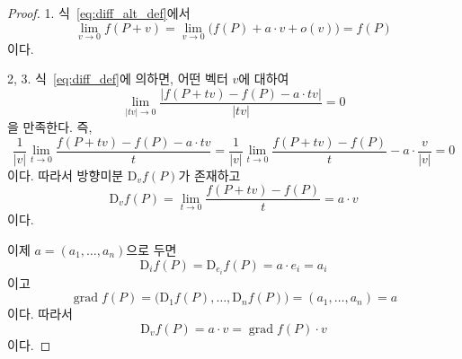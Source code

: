 \documentclass[unfonts,oneside,a4paper]{oblivoir}
\theoremstyle{definition}
\theoremstyle{theorem}
\renewcommand{\vec}[1]{\bm{\mathit{#1}}}
\newcommand{\vecz}{\bm{\mathrm{0}}}
\newcommand{\dD}{\mathrm{D}}
\DeclareMathOperator{\grad}{grad}
\begin{document}
\begin{proof}
    1. 식~\ref{eq:diff_alt_def}에서
    \begin{equation*}
        \lim_{\vec v \rightarrow \vecz} f(P + \vec v) = \lim_{\vec v \rightarrow \vecz} \bigl(f(P) + \vec a \cdot \vec v + o(\vec v)\bigr) = f(P)
    \end{equation*}
    이다.

    2, 3. 식~\ref{eq:diff_def}에 의하면, 어떤 벡터 $\vec v$에 대하여
    \begin{equation*}
        \lim_{|t \vec v| \rightarrow 0} \frac{|f(P + t \vec v) - f(P) - \vec a \cdot t \vec v|}{|t \vec v|} = 0
    \end{equation*}
    을 만족한다.
    즉,
    \begin{equation*}
        \frac{1}{|\vec v|} \lim_{t \rightarrow 0} \frac{f(P + t \vec v) - f(P) - \vec a \cdot t \vec v}{t} = \frac{1}{|\vec v|} \lim_{t \rightarrow 0} \frac{f(P + t \vec v) - f(P)}{t} - \vec a \cdot \frac{\vec v}{|\vec v|} = 0
    \end{equation*}
    이다.
    따라서 방향미분 $\dD_{\vec v} f(P)$가 존재하고
    \begin{equation*}
        \dD_{\vec v} f(P) = \lim_{t \rightarrow 0} \frac{f(P + t \vec v) - f(P)}{t} = \vec a \cdot \vec v
    \end{equation*}
    이다.

    이제 $\vec a = (a_1, \dots, a_n)$으로 두면
    \begin{equation*}
        \dD_i f(P) = \dD_{\vec e_i} f(P) = \vec a \cdot \vec e_i = a_i
    \end{equation*}
    이고
    \begin{equation*}
        \grad f(P) = \bigl(\dD_1 f(P), \dots, \dD_n f(P)\bigr) = (a_1, \dots, a_n) = \vec a
    \end{equation*}
    이다.
    따라서
    \begin{equation*}
        \dD_{\vec v} f(P) = \vec a \cdot \vec v = \grad f(P) \cdot \vec v
    \end{equation*}
    이다.
\end{proof}
\end{document}
